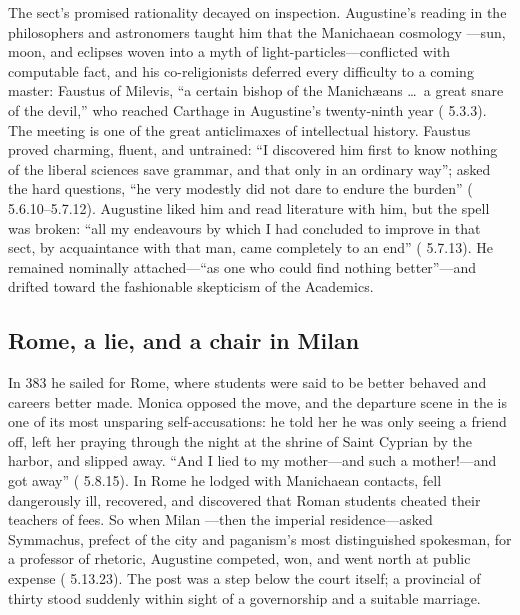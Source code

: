 The sect's promised rationality decayed on inspection. Augustine's reading in
the philosophers and astronomers taught him that the Manichaean cosmology
---sun, moon, and eclipses woven into a myth of light-particles---conflicted
with computable fact, and his co-religionists deferred every difficulty to a
coming master: Faustus of Milevis, ``a certain bishop of the Manich\ae ans
\ldots\ a great snare of the devil,'' who reached Carthage in Augustine's
twenty-ninth year ( 5.3.3). The meeting is one of the great
anticlimaxes of intellectual history. Faustus proved charming, fluent, and
untrained: ``I discovered him first to know nothing of the liberal sciences
save grammar, and that only in an ordinary way''; asked the hard questions,
``he very modestly did not dare to endure the burden'' (
5.6.10--5.7.12). Augustine liked him and read literature with him, but the
spell was broken: ``all my endeavours by which I had concluded to improve in
that sect, by acquaintance with that man, came completely to an end''
( 5.7.13). He remained nominally attached---``as one who
could find nothing better''---and drifted toward the fashionable skepticism
of the Academics.

\subsection{Rome, a lie, and a chair in Milan}

In 383 he sailed for Rome, where students were said to be better behaved and
careers better made. Monica opposed the move, and the departure scene in the
 is one of its most unsparing self-accusations: he told her
he was only seeing a friend off, left her praying through the night at the
shrine of Saint Cyprian by the harbor, and slipped away. ``And I lied to my
mother---and such a mother!---and got away'' ( 5.8.15). In
Rome he lodged with Manichaean contacts, fell dangerously ill, recovered, and
discovered that Roman students cheated their teachers of fees. So when Milan
---then the imperial residence---asked Symmachus, prefect of the city and
paganism's most distinguished spokesman, for a professor of rhetoric,
Augustine competed, won, and went north at public expense
( 5.13.23). The post was a step below the court itself; a
provincial of thirty stood suddenly within sight of a governorship and a
suitable marriage.

